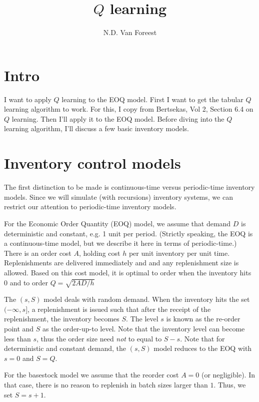 \documentclass{article}
\title{$Q$ learning}
\author{N.D. Van Foreest}
\begin{document}
\maketitle

\tableofcontents

\section{Intro}
\label{sec:intro}



I want to apply $Q$ learning to the EOQ model. First I want to get
the tabular $Q$ learning algorithm to work.  For this,  I copy from
Bertsekas, Vol 2, Section 6.4 on $Q$ learning.  Then I'll apply it to the EOQ model. Before diving into the $Q$ learning algorithm, I'll discuss a few basic inventory models. 

\section{Inventory control models}
\label{sec:invent-contr-models}

The first distinction to be made is continuous-time versus periodic-time inventory models. Since we will simulate (with recursions) inventory systems, we can restrict our attention to periodic-time inventory models. 

For the Economic Order Quantity (EOQ) model, we assume that demand $D$ is deterministic and constant, e.g. 1 unit per period. (Strictly speaking, the EOQ is a continuous-time model, but we describe it here in terms of periodic-time.) There is an order cost $A$, holding cost $h$ per unit inventory per unit time. Replenishments are delivered immediately and and any replenishment size is allowed. Based on this cost model, it is optimal to order when the inventory hits $0$ and to order $Q=\sqrt{2AD/h}$

The $(s,S)$ model deals with random demand. When the inventory hits the set $(-\infty, s]$, a replenishment is issued such that after the receipt of the replenishment, the inventory becomes $S$. 
The level $s$ is known as the re-order point and  $S$ as the order-up-to level. Note that the inventory level can become less than $s$, thus the order size need \emph{not}  to equal to $S-s$. 
Note that for deterministic and constant demand, the $(s,S)$ model reduces to the EOQ with $s=0$ and $S=Q$. 

For the basestock model we assume that the reorder cost $A=0$ (or negligible). In that case, there is no reason to replenish in batch sizes larger than $1$. Thus, we set $S=s+1$. 
\end{document}
